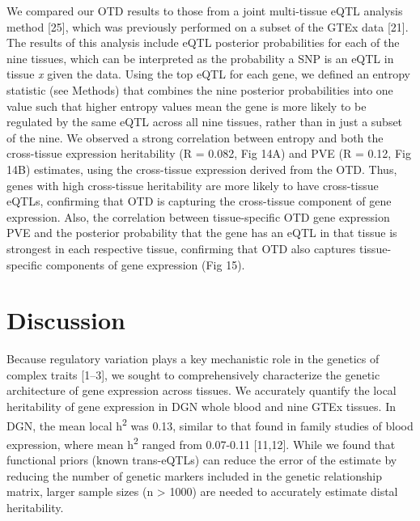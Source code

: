 \documentclass[]{article}
\begin{document}
We compared our OTD results to those from a joint multi-tissue eQTL
analysis method {[}25{]}, which was previously performed on a subset of
the GTEx data {[}21{]}. The results of this analysis include eQTL
posterior probabilities for each of the nine tissues, which can be
interpreted as the probability a SNP is an eQTL in tissue \emph{x} given
the data. Using the top eQTL for each gene, we defined an entropy
statistic (see Methods) that combines the nine posterior probabilities
into one value such that higher entropy values mean the gene is more
likely to be regulated by the same eQTL across all nine tissues, rather
than in just a subset of the nine. We observed a strong correlation
between entropy and both the cross-tissue expression heritability (R =
0.082, Fig 14A) and PVE (R = 0.12, Fig 14B) estimates, using the
cross-tissue expression derived from the OTD. Thus, genes with high
cross-tissue heritability are more likely to have cross-tissue eQTLs,
confirming that OTD is capturing the cross-tissue component of gene
expression. Also, the correlation between tissue-specific OTD gene
expression PVE and the posterior probability that the gene has an eQTL
in that tissue is strongest in each respective tissue, confirming that
OTD also captures tissue-specific components of gene expression (Fig
15).

\section{Discussion}\label{discussion}

Because regulatory variation plays a key mechanistic role in the
genetics of complex traits {[}1--3{]}, we sought to comprehensively
characterize the genetic architecture of gene expression across tissues.
We accurately quantify the local heritability of gene expression in DGN
whole blood and nine GTEx tissues. In DGN, the mean local
h\textsuperscript{2} was 0.13, similar to that found in family studies
of blood expression, where mean h\textsuperscript{2} ranged from
0.07-0.11 {[}11,12{]}. While we found that functional priors (known
trans-eQTLs) can reduce the error of the estimate by reducing the number
of genetic markers included in the genetic relationship matrix, larger
sample sizes (n \textgreater{} 1000) are needed to accurately estimate
distal heritability.
\end{document}

